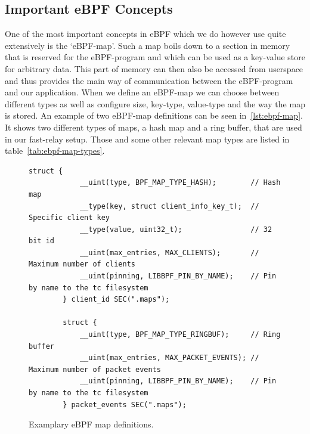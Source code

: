 \subsection{Important eBPF Concepts}
One of the most important concepts in eBPF which we do however use quite extensively is 
the `eBPF-map'.
Such a map boils down to a section in memory that is reserved for the eBPF-program
and which can be used as a key-value store for arbitrary data.
This part of memory can then also be accessed from userspace and thus provides the main 
way of communication between the eBPF-program and our application.
When we define an eBPF-map we can choose between different types as well as configure
size, key-type, value-type and the way the map is stored. %
An example of two eBPF-map definitions can be seen in~\autoref{lst:ebpf-map}.
It shows two different types of maps, a hash map and a ring buffer, that are used in
our fast-relay setup.
Those and some other relevant map types are listed in table~\autoref{tab:ebpf-map-types}.

\vspace{0.5cm}
\begin{figure}[htbp]
    \begin{lstlisting}[style=CStyle]
        struct {
            __uint(type, BPF_MAP_TYPE_HASH);        // Hash map
            __type(key, struct client_info_key_t);  // Specific client key
            __type(value, uint32_t);                // 32 bit id
            __uint(max_entries, MAX_CLIENTS);       // Maximum number of clients
            __uint(pinning, LIBBPF_PIN_BY_NAME);    // Pin by name to the tc filesystem
        } client_id SEC(".maps");

        struct {
            __uint(type, BPF_MAP_TYPE_RINGBUF);     // Ring buffer
            __uint(max_entries, MAX_PACKET_EVENTS); // Maximum number of packet events
            __uint(pinning, LIBBPF_PIN_BY_NAME);    // Pin by name to the tc filesystem
        } packet_events SEC(".maps");
    \end{lstlisting}
    \caption[Examplary eBPF map definitions]{Examplary eBPF map definitions.}\label{lst:ebpf-map}
\end{figure}

\FloatBarrier

